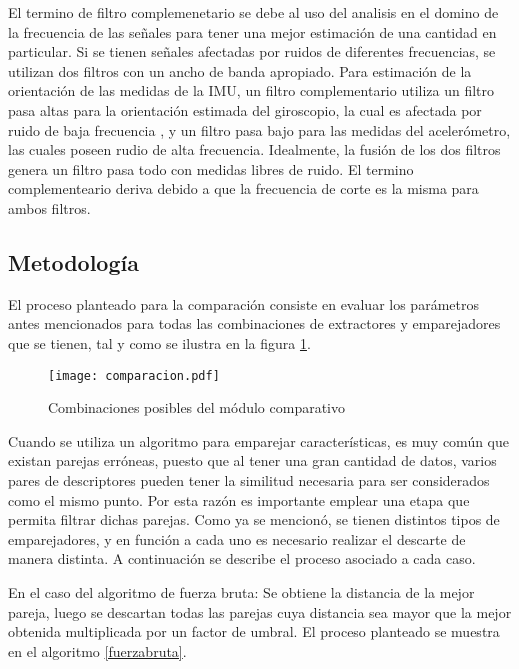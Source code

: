 El termino de filtro complemenetario se debe al uso del analisis en el domino de la frecuencia de las señales para tener una mejor estimación de una cantidad en particular. Si se tienen señales afectadas por  ruidos de diferentes frecuencias, se utilizan dos filtros con un ancho de banda apropiado. Para estimación de la orientación de las medidas de la IMU, un filtro complementario utiliza un filtro pasa altas para la orientación estimada del giroscopio, la cual es afectada por  ruido de baja frecuencia , y un filtro pasa bajo para las medidas del acelerómetro, las cuales poseen rudio de alta frecuencia. Idealmente, la fusión de los dos filtros genera un filtro pasa todo con medidas libres de ruido. El termino complementeario deriva debido a que la frecuencia de corte es la misma para ambos filtros. \\



\subsection{Metodología}

El proceso planteado para la comparación consiste en evaluar los parámetros antes mencionados para todas las combinaciones de extractores y emparejadores que se tienen, tal y como se ilustra en la figura \ref{imagen:comparacion}.

\begin{figure}[H]
	\centering
	\texttt{[image: comparacion.pdf]}
	\caption[Combinación de algoritmos para el analisis de rendimiento]{Combinaciones posibles del módulo comparativo}
	\label{imagen:comparacion}
\end{figure}

Cuando se utiliza un algoritmo para emparejar características, es muy común que existan parejas erróneas, puesto que al tener una gran cantidad de datos, varios pares de descriptores pueden tener la similitud necesaria para ser considerados como el mismo punto. Por esta razón es importante emplear una etapa que permita filtrar dichas parejas. Como ya se mencionó, se tienen distintos tipos de emparejadores, y en función a cada uno es necesario realizar el descarte de manera distinta. A continuación se describe el proceso asociado a cada caso.

En el caso del algoritmo de fuerza bruta: Se obtiene la distancia de la mejor pareja, luego se descartan todas las parejas cuya distancia sea mayor que la mejor obtenida multiplicada por un factor de umbral. El proceso planteado se muestra en el algoritmo \ref{fuerzabruta}.

